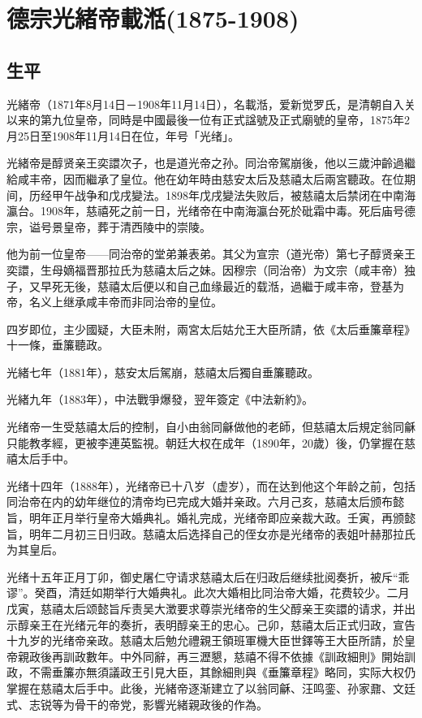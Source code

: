 
\section{德宗光緒帝載湉\tiny(1875-1908)}

\subsection{生平}

光緒帝（1871年8月14日－1908年11月14日），名載湉，爱新觉罗氏，是清朝自入关以来的第九位皇帝，同時是中國最後一位有正式諡號及正式廟號的皇帝，1875年2月25日至1908年11月14日在位，年号「光绪」。

光緒帝是醇贤亲王奕譞次子，也是道光帝之孙。同治帝駕崩後，他以三歲沖齡過繼給咸丰帝，因而繼承了皇位。他在幼年時由慈安太后及慈禧太后兩宮聽政。在位期间，历经甲午战争和戊戌變法。1898年戊戌變法失败后，被慈禧太后禁闭在中南海瀛台。1908年，慈禧死之前一日，光绪帝在中南海瀛台死於砒霜中毒。死后庙号德宗，谥号景皇帝，葬于清西陵中的崇陵。

他为前一位皇帝——同治帝的堂弟兼表弟。其父为宣宗（道光帝）第七子醇贤亲王奕譞，生母嫡福晋那拉氏为慈禧太后之妹。因穆宗（同治帝）为文宗（咸丰帝）独子，又早死无後，慈禧太后便以和自己血缘最近的载湉，過繼于咸丰帝，登基为帝，名义上继承咸丰帝而非同治帝的皇位。


四岁即位，主少國疑，大臣未附，兩宮太后姑允王大臣所請，依《太后垂簾章程》十一條，垂簾聽政。

光緒七年（1881年），慈安太后駕崩，慈禧太后獨自垂簾聽政。

光緒九年（1883年），中法戰爭爆發，翌年簽定《中法新約》。

光绪帝一生受慈禧太后的控制，自小由翁同龢做他的老師，但慈禧太后規定翁同龢只能教孝經，更被李連英監視。朝廷大权在成年（1890年，20歲）後，仍掌握在慈禧太后手中。

光绪十四年（1888年），光绪帝已十八岁（虚岁），而在达到他这个年龄之前，包括同治帝在内的幼年继位的清帝均已完成大婚并亲政。六月己亥，慈禧太后颁布懿旨，明年正月举行皇帝大婚典礼。婚礼完成，光绪帝即应亲裁大政。壬寅，再颁懿旨，明年二月初三日归政。慈禧太后选择自己的侄女亦是光绪帝的表姐叶赫那拉氏为其皇后。

光绪十五年正月丁卯，御史屠仁守请求慈禧太后在归政后继续批阅奏折，被斥“乖谬”。癸酉，清廷如期举行大婚典礼。此次大婚相比同治帝大婚，花费较少。二月戊寅，慈禧太后颂懿旨斥责吴大澂要求尊崇光绪帝的生父醇亲王奕譞的请求，并出示醇亲王在光绪元年的奏折，表明醇亲王的忠心。己卯，慈禧太后正式归政，宣告十九岁的光绪帝亲政。慈禧太后勉允禮親王領班軍機大臣世鐸等王大臣所請，於皇帝親政後再訓政數年。中外同辭，再三瀝懇，慈禧不得不依據《訓政細則》開始訓政，不需垂簾亦無須議政王引見大臣，其餘細則與《垂簾章程》略同，实际大权仍掌握在慈禧太后手中。此後，光緒帝逐渐建立了以翁同龢、汪鸣銮、孙家鼐、文廷式、志锐等为骨干的帝党，影響光緒親政後的作為。

